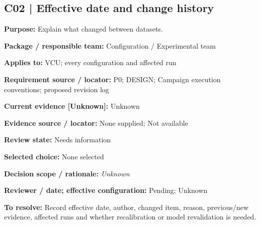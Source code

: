 \documentclass[11pt]{article}
\begin{document}
\par\noindent\begin{minipage}{\textwidth}\small\setlength{\parskip}{2pt}
\subsection*{C02 | Effective date and change history}
\textbf{Purpose:} Explain what changed between datasets.\par
\textbf{Package / responsible team:} Configuration / Experimental team\par
\textbf{Applies to:} VCU; every configuration and affected run\par
\textbf{Requirement source / locator:} P0; DESIGN; Campaign execution conventions; proposed revision log\par
\textbf{Current evidence [Unknown]:} Unknown\par
\textbf{Evidence source / locator:} None supplied; Not available\par
\textbf{Review state:} Needs information\par
\textbf{Selected choice:} None selected\par
\textbf{Decision scope / rationale:} \textit{Unknown}\par
\textbf{Reviewer / date; effective configuration:} Pending; Unknown\par
\textbf{To resolve:} Record effective date, author, changed item, reason, previous/new evidence, affected runs and whether recalibration or model revalidation is needed.\par
\end{minipage}\par\vspace{5pt}
\end{document}
